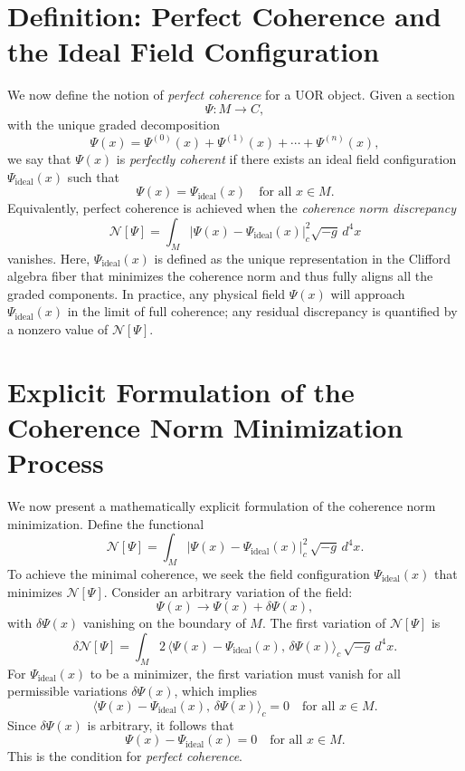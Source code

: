 \documentclass[12pt]{article}
\begin{document}
\section*{Definition: Perfect Coherence and the Ideal Field Configuration}
We now define the notion of \emph{perfect coherence} for a UOR object. Given a section 
\[
\Psi: M \to C,
\]
with the unique graded decomposition 
\[
\Psi(x) = \Psi^{(0)}(x) + \Psi^{(1)}(x) + \cdots + \Psi^{(n)}(x),
\]
we say that \(\Psi(x)\) is \emph{perfectly coherent} if there exists an ideal field configuration \(\Psi_{\mathrm{ideal}}(x)\) such that
\[
\Psi(x) = \Psi_{\mathrm{ideal}}(x) \quad \text{for all } x \in M.
\]
Equivalently, perfect coherence is achieved when the \emph{coherence norm discrepancy}
\[
\mathcal{N}[\Psi] = \int_M \lvert \Psi(x) - \Psi_{\mathrm{ideal}}(x)\rvert_c^2 \sqrt{-g}\, d^4x
\]
vanishes. Here, \(\Psi_{\mathrm{ideal}}(x)\) is defined as the unique representation in the Clifford algebra fiber that minimizes the coherence norm and thus fully aligns all the graded components. In practice, any physical field \(\Psi(x)\) will approach \(\Psi_{\mathrm{ideal}}(x)\) in the limit of full coherence; any residual discrepancy is quantified by a nonzero value of \(\mathcal{N}[\Psi]\).

\section*{Explicit Formulation of the Coherence Norm Minimization Process}
We now present a mathematically explicit formulation of the coherence norm minimization. Define the functional
\[
\mathcal{N}[\Psi] = \int_M \lvert \Psi(x) - \Psi_{\mathrm{ideal}}(x) \rvert_c^2 \, \sqrt{-g}\, d^4x.
\]
To achieve the minimal coherence, we seek the field configuration \(\Psi_{\mathrm{ideal}}(x)\) that minimizes \(\mathcal{N}[\Psi]\). Consider an arbitrary variation of the field:
\[
\Psi(x) \to \Psi(x) + \delta \Psi(x),
\]
with \(\delta \Psi(x)\) vanishing on the boundary of \(M\). The first variation of \(\mathcal{N}[\Psi]\) is
\[
\delta \mathcal{N}[\Psi] = \int_M 2\, \langle \Psi(x) - \Psi_{\mathrm{ideal}}(x),\, \delta \Psi(x) \rangle_c \, \sqrt{-g}\, d^4x.
\]
For \(\Psi_{\mathrm{ideal}}(x)\) to be a minimizer, the first variation must vanish for all permissible variations \(\delta \Psi(x)\), which implies
\[
\langle \Psi(x) - \Psi_{\mathrm{ideal}}(x),\, \delta \Psi(x) \rangle_c = 0 \quad \text{for all } x\in M.
\]
Since \(\delta \Psi(x)\) is arbitrary, it follows that
\[
\Psi(x) - \Psi_{\mathrm{ideal}}(x) = 0 \quad \text{for all } x \in M.
\]
This is the condition for \emph{perfect coherence}. 
\end{document}

